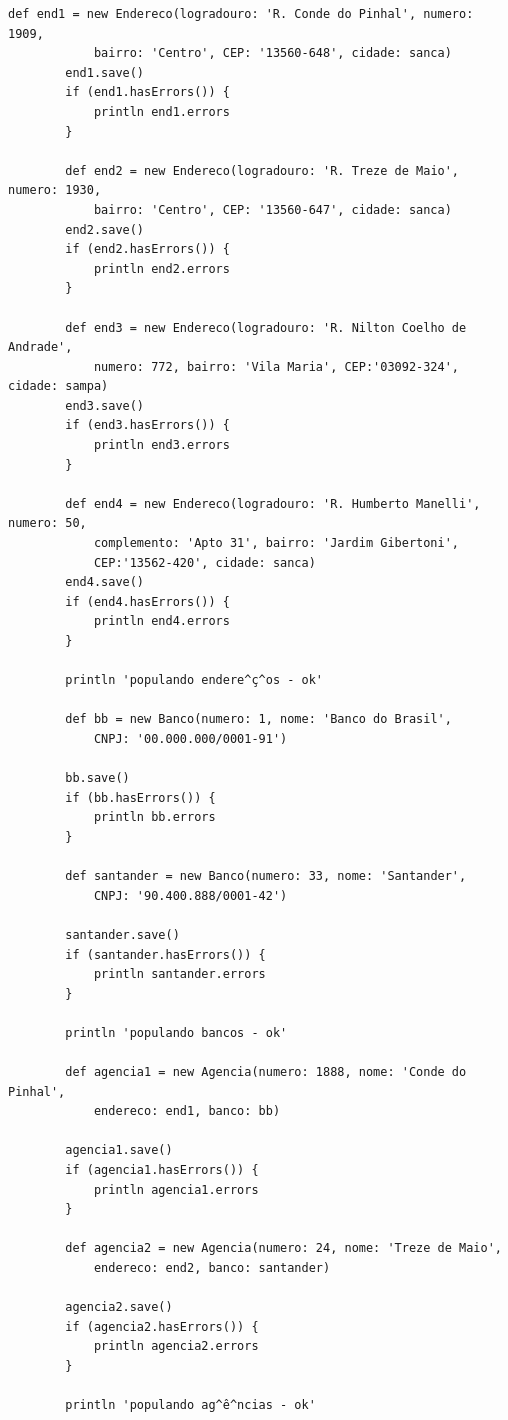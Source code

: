 \begin{lstlisting}[caption={\bf BootStrap.groovy (2)}, frame = trBL, float=htbp,
    label=codBootStrap2] 
        def end1 = new Endereco(logradouro: 'R. Conde do Pinhal', numero: 1909, 
            bairro: 'Centro', CEP: '13560-648', cidade: sanca)        
        end1.save()
        if (end1.hasErrors()) {
            println end1.errors
        }
        
        def end2 = new Endereco(logradouro: 'R. Treze de Maio', numero: 1930, 
            bairro: 'Centro', CEP: '13560-647', cidade: sanca)
        end2.save()
        if (end2.hasErrors()) {
            println end2.errors
        }
        
        def end3 = new Endereco(logradouro: 'R. Nilton Coelho de Andrade',
            numero: 772, bairro: 'Vila Maria', CEP:'03092-324', cidade: sampa)        
        end3.save()
        if (end3.hasErrors()) {
            println end3.errors
        }
        
        def end4 = new Endereco(logradouro: 'R. Humberto Manelli', numero: 50, 
            complemento: 'Apto 31', bairro: 'Jardim Gibertoni', 
            CEP:'13562-420', cidade: sanca)
        end4.save()
        if (end4.hasErrors()) {
            println end4.errors
        }
        
        println 'populando endere^ç^os - ok'

        def bb = new Banco(numero: 1, nome: 'Banco do Brasil', 
            CNPJ: '00.000.000/0001-91')
        
        bb.save()
        if (bb.hasErrors()) {
            println bb.errors
        }
        
        def santander = new Banco(numero: 33, nome: 'Santander', 
            CNPJ: '90.400.888/0001-42')
        
        santander.save()
        if (santander.hasErrors()) {
            println santander.errors
        }

        println 'populando bancos - ok'
        
        def agencia1 = new Agencia(numero: 1888, nome: 'Conde do Pinhal', 
            endereco: end1, banco: bb)
        
        agencia1.save()
        if (agencia1.hasErrors()) {
            println agencia1.errors
        }
        
        def agencia2 = new Agencia(numero: 24, nome: 'Treze de Maio', 
            endereco: end2, banco: santander)
        
        agencia2.save()
        if (agencia2.hasErrors()) {
            println agencia2.errors
        }
        
        println 'populando ag^ê^ncias - ok'
\end{lstlisting}

